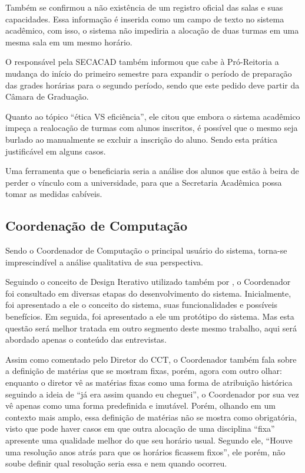 Também se confirmou a não existência de um registro oficial das salas e suas capacidades. Essa informação é inserida como um campo de texto no sistema acadêmico, com isso, o sistema não impediria a alocação de duas turmas em uma mesma sala em um mesmo horário.

O responsável pela SECACAD também informou que cabe à Pró-Reitoria a mudança do início do primeiro semestre para expandir o período de preparação das grades horárias para o segundo período, sendo que este pedido deve partir da Câmara de Graduação.

Quanto ao tópico ``ética VS eficiência'', ele citou que embora o sistema acadêmico impeça a realocação de turmas com alunos inscritos, é possível que o mesmo seja burlado ao manualmente se excluir a inscrição do aluno. Sendo esta prática justificável em alguns casos.

Uma ferramenta que o beneficiaria seria a análise dos alunos que estão à beira de perder o vínculo com a universidade, para que a Secretaria Acadêmica possa tomar as medidas cabíveis.

\subsection{Coordenação de Computação} \label{ssec:3_Coordenador} %

Sendo o Coordenador de Computação o principal usuário do sistema, torna-se imprescindível a análise qualitativa de sua perspectiva.

Seguindo o conceito de Design Iterativo utilizado também por , o Coordenador foi consultado em diversas etapas do desenvolvimento do sistema. Inicialmente, foi apresentado a ele o conceito do sistema, suas funcionalidades e possíveis benefícios. Em seguida, foi apresentado a ele um protótipo do sistema. Mas esta questão será melhor tratada em outro segmento deste mesmo trabalho, aqui será abordado apenas o conteúdo das entrevistas.

Assim como comentado pelo Diretor do CCT, o Coordenador também fala sobre a definição de matérias que se mostram fixas, porém, agora com outro olhar: enquanto o diretor vê as matérias fixas como uma forma de atribuição histórica seguindo a ideia de ``já era assim quando eu cheguei'', o Coordenador por sua vez vê apenas como uma forma predefinida e imutável. Porém, olhando em um contexto mais amplo, essa definição de matérias não se mostra como obrigatória, visto que pode haver casos em que outra alocação de uma disciplina ``fixa'' apresente uma qualidade melhor do que seu horário usual. Segundo ele, ``Houve uma resolução anos atrás para que os horários ficassem fixos'', ele porém, não soube definir qual resolução seria essa e nem quando ocorreu.


